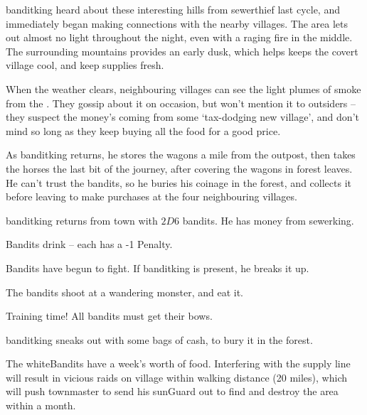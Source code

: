\begin{multicols}{2}

\begin{exampletext}
  \noindent
  \Gls{banditking} heard about these interesting hills from \gls{sewerthief} last \gls{cycle}, and immediately began making connections with the nearby \glspl{village}.
  The area lets out almost no light throughout the night, even with a raging fire in the middle.
  The surrounding mountains provides an early dusk, which helps keeps the covert \gls{village} cool, and keep supplies fresh.
\end{exampletext}

When the weather clears, neighbouring \glspl{village} can see the light plumes of smoke from the .
They gossip about it on occasion, but won't mention it to outsiders -- they suspect the money's coming from some `tax-dodging new \gls{village}', and don't mind so long as they keep buying all the food for a good price.

As \gls{banditking} returns, he stores the wagons a mile from the outpost, then takes the horses the last bit of the journey, after covering the wagons in forest leaves.
He can't trust the bandits, so he buries his coinage in the forest, and collects it before leaving to make purchases at the four neighbouring \glspl{village}.

\begin{dlist}
  \item
  \Gls{banditking} returns from \gls{town} with $2D6$ bandits.
  He has money from \gls{sewerking}.
  \item
  Bandits drink -- each has a -1 Penalty.
  \item
  Bandits have begun to fight.
  If \gls{banditking} is present, he breaks it up.
  \item
  The bandits shoot at a wandering monster, and eat it.
  \item
  Training time!
  All bandits must get their bows.
  \item
  \Gls{banditking} sneaks out with some bags of cash, to bury it in the forest.
\end{dlist}

The \gls{whiteBandits} have a week's worth of food.
Interfering with the supply line will result in vicious raids on \gls{village} within walking distance (20 miles), which will push \gls{townmaster} to send his \gls{sunGuard} out to find and destroy the area within a month.

\end{multicols}
